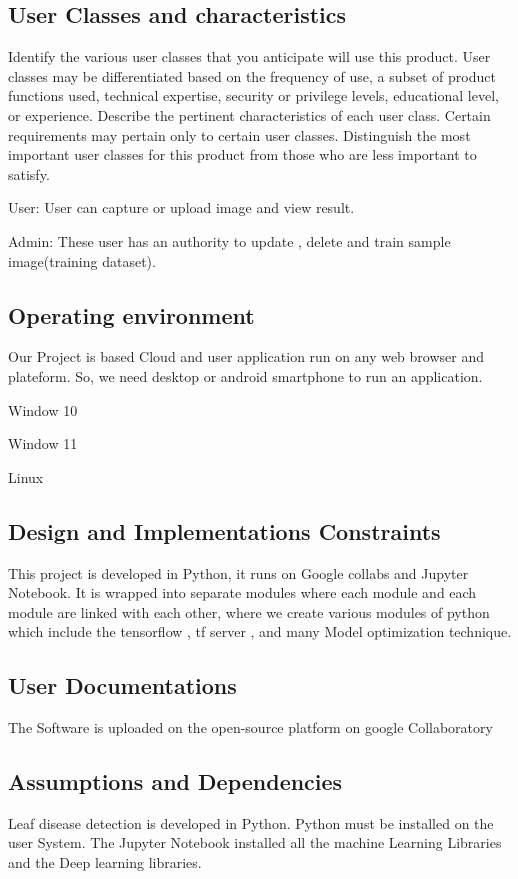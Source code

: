 \documentclass{article}
\begin{document}
\subsection{User Classes and characteristics}
Identify the various user classes that you anticipate will use this product. User classes may be differentiated
based on the frequency of use, a subset of product functions used, technical expertise, security or privilege
levels, educational level, or experience. Describe the pertinent characteristics of each user class. Certain
requirements may pertain only to certain user classes. Distinguish the most important user classes for this
product from those who are less important to satisfy.
\item User: User can capture or upload image and view result.
\item Admin: These user has an authority to update , delete and train sample image(training dataset).
\subsection{Operating environment }
Our Project is based Cloud and user application run on any web browser and plateform. So, we need desktop or
android smartphone to run an application.
\item Window 10
\item Window 11
\item Linux 
\subsection{Design and Implementations Constraints}
This project is developed in Python, it runs on Google collabs and Jupyter Notebook. It is wrapped into separate
modules where each module and each module are linked with each other, where we create various modules of
python which include the tensorflow , tf server , and many Model optimization technique.
\subsection{User Documentations }
The Software is uploaded on the open-source platform on google Collaboratory
\subsection{Assumptions and Dependencies}
Leaf disease detection is developed in Python. Python must be installed on the user System. The Jupyter Notebook
installed all the machine Learning Libraries and the Deep learning libraries. 
\end{document}
